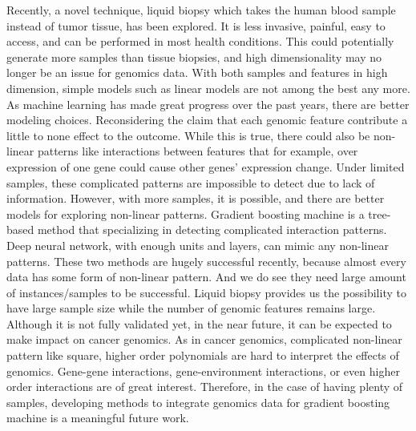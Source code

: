 Recently, a novel technique, liquid biopsy which takes the human blood sample instead of tumor tissue, has been explored. It is less invasive, painful, easy to access, and can be performed in most health conditions. This could potentially generate more samples than tissue biopsies, and high dimensionality may no longer be an issue for genomics data. With both samples and features in high dimension, simple models such as linear models are not among the best any more. As machine learning has made great progress over the past years, there are better modeling choices. Reconsidering the claim that each genomic feature contribute a little to none effect to the outcome. While this is true, there could also be non-linear patterns like interactions between features that for example, over expression of one gene could cause other genes' expression change. Under limited samples, these complicated patterns are impossible to detect due to lack of information. However, with more samples, it is possible, and there are better models for exploring non-linear patterns. Gradient boosting machine is a tree-based method that specializing in detecting complicated interaction patterns. Deep neural network, with enough units and layers, can mimic any non-linear patterns. These two methods are hugely successful recently, because almost every data has some form of non-linear pattern. And we do see they need large amount of instances/samples to be successful. Liquid biopsy provides us the possibility to have large sample size while the number of genomic features remains large. Although it is not fully validated yet, in the near future, it can be expected to make impact on cancer genomics. As in cancer genomics, complicated non-linear pattern like square, higher order polynomials are hard to interpret the effects of genomics. Gene-gene interactions, gene-environment interactions, or even higher order interactions are of great interest. Therefore, in the case of having plenty of samples, developing methods to integrate genomics data for gradient boosting machine is a meaningful future work.

